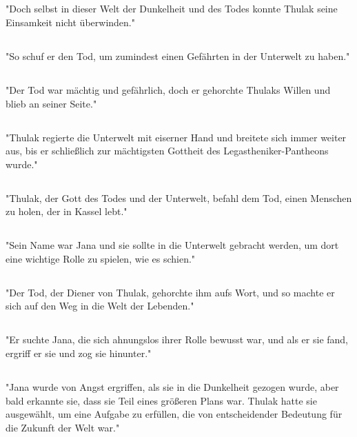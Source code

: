 \documentclass{article}
\begin{document}
\subsection{}
"Doch selbst in dieser Welt der Dunkelheit und des Todes konnte Thulak seine Einsamkeit nicht überwinden."
\subsection{}
"So schuf er den Tod, um zumindest einen Gefährten in der Unterwelt zu haben."
\subsection{}
"Der Tod war mächtig und gefährlich, doch er gehorchte Thulaks Willen und blieb an seiner Seite."
\subsection{}
"Thulak regierte die Unterwelt mit eiserner Hand und breitete sich immer weiter aus, bis er schließlich zur mächtigsten Gottheit des Legastheniker-Pantheons wurde."
\subsection{}
"Thulak, der Gott des Todes und der Unterwelt, befahl dem Tod, einen Menschen zu holen, der in Kassel lebt."
\subsection{}
"Sein Name war Jana und sie sollte in die Unterwelt gebracht werden, um dort eine wichtige Rolle zu spielen, wie es schien."
\subsection{}
"Der Tod, der Diener von Thulak, gehorchte ihm aufs Wort, und so machte er sich auf den Weg in die Welt der Lebenden."
\subsection{}
"Er suchte Jana, die sich ahnungslos ihrer Rolle bewusst war, und als er sie fand, ergriff er sie und zog sie hinunter."
\subsection{}
"Jana wurde von Angst ergriffen, als sie in die Dunkelheit gezogen wurde, aber bald erkannte sie, dass sie Teil eines größeren Plans war. Thulak hatte sie ausgewählt, um eine Aufgabe zu erfüllen, die von entscheidender Bedeutung für die Zukunft der Welt war."
\end{document}
